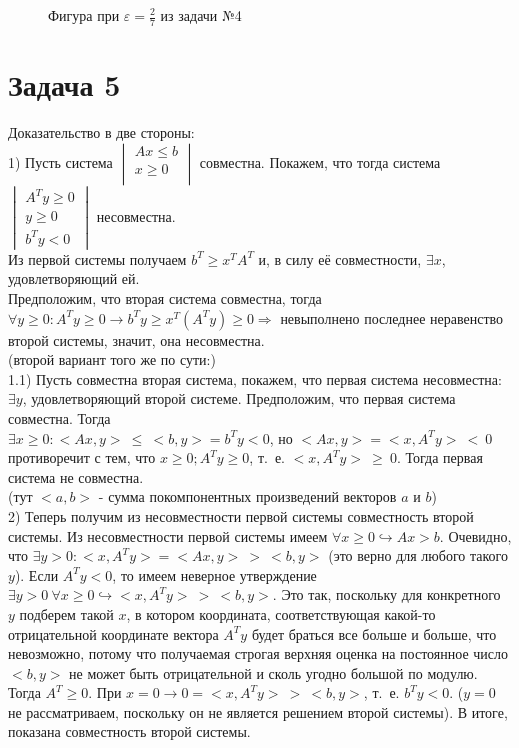 \documentclass[a4paper,12pt]{article} %
\begin{document}
\begin{figure}[H]
\caption{Фигура при $\varepsilon = \frac{2}{7}$ из задачи №4} 
\end{figure}



\section*{Задача 5}

Доказательство в две стороны:\\
1) Пусть система 
$\begin{vmatrix}
Ax \leq b\\
x \geq 0\\
\end{vmatrix}
$ совместна. Покажем, что тогда система 
$\begin{vmatrix}
A^{T}y \geq 0\\
y \geq 0\\
b^{T}y < 0
\end{vmatrix}
$ несовместна.\\
Из первой системы получаем $b^{T} \geq x^{T}A^{T}$ и, в силу её совместности, $\exists x$, удовлетворяющий ей.\\ 
Предположим, что вторая система совместна, тогда \\ $\forall y \geq 0: A^{T}y \geq 0 \rightarrow b^{T}y 
\geq x^{T}(A^{T}y) \geq 0 \Rightarrow $ невыполнено последнее неравенство второй системы, значит, она несовместна.\\

(второй вариант того же по сути:)\\
1.1) Пусть совместна вторая система, покажем, что первая система несовместна:\\
$\exists y$, удовлетворяющий второй системе. Предположим, что первая система совместна. Тогда \\
$\exists x\geq 0:<Ax,y>~\leq~ <b,y>=b^{T}y<0$, но $<Ax,y> = <x,A^{T}y> ~<~ 0$ противоречит с тем, что $x \geq 0; A^{T}y
\geq 0$, т.~е. $<x,A^{T}y>~\geq~0$. Тогда первая система не совместна.\\
(тут $<a,b>$ - сумма покомпонентных произведений векторов $a$ и $b$)\\ 
 
 2) Теперь получим из несовместности первой системы совместность второй системы. Из несовместности первой системы имеем $\forall x 
 \geq 0 \hookrightarrow Ax 
 > b$. Очевидно, что $\exists y > 0 : <x,A^{T}y> = <Ax,y> ~>~ <b,y>$ (это верно для любого такого $y$). Если $A^{T}y < 0$, то имеем неверное утверждение $\exists y >0 ~\forall x 
 \geq 0 \hookrightarrow <x,A^{T}y> ~>~ <b,y>$. Это так, поскольку для конкретного $y$ подберем такой $x$, в котором координата, соответствующая какой-то отрицательной координате вектора $A^{T}y$ будет браться все больше и больше, что невозможно, потому что получаемая строгая верхняя оценка на  постоянное число $<b,y>$ не может быть отрицательной и сколь угодно большой по модулю. Тогда $A^{T}\geq 0$. При $x=0 \rightarrow 0= <x,A^{T}y>~>~<b,y>$, т.~е. $b^{T}y < 0$. ($y=0$ не рассматриваем, поскольку он не является решением второй системы). В итоге, показана совместность второй системы.\\
  
\end{document}
